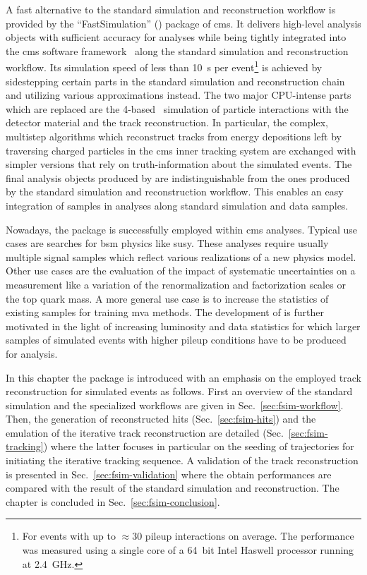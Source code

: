 A fast alternative to the standard simulation and reconstruction workflow is provided by the ``FastSimulation'' (\FSIM[format=hyperbf]) package of \gls{cms}. It delivers high-level analysis objects with sufficient accuracy for analyses while being tightly integrated into the \gls{cms} software framework~\cite{Bayatian:922757} along the standard simulation and reconstruction workflow. Its simulation speed of less than 10~s per event\footnote{For events with up to $\approx30$ pileup interactions on average. The performance was measured using a single core of a 64~bit Intel Haswell processor running at 2.4~GHz.} is achieved by sidestepping certain parts in the standard simulation and reconstruction chain and utilizing various approximations instead. The two major CPU-intense parts which are replaced are the \GEANT{}4-based~\cite{Agostinelli2003250} simulation of particle interactions with the detector material and the track reconstruction. In particular, the complex, multistep algorithms which reconstruct tracks from energy depositions left by traversing charged particles in the \gls{cms} inner tracking system are exchanged with simpler versions that rely on truth-information about the simulated events. The final analysis objects produced by \FSIM are indistinguishable from the ones produced by the standard simulation and reconstruction workflow. This enables an easy integration of \FSIM samples in analyses along standard simulation and data samples.

Nowadays, the \FSIM package is successfully employed within \gls{cms} analyses. Typical use cases are searches for \acrfull{bsm} physics like \acrfull{susy}. These analyses require usually multiple signal samples which reflect various realizations of a new physics model. Other use cases are the evaluation of the impact of systematic uncertainties on a measurement like a variation of the renormalization and factorization scales or the top quark mass. A more general use case is to increase the statistics of existing samples for training \acrfull{mva} methods. The development of \FSIM is further motivated in the light of increasing luminosity and data statistics for which larger samples of simulated events with higher pileup conditions have to be produced for analysis.

In this chapter the \FSIM package is introduced with an emphasis on the employed track reconstruction for simulated events as follows. First an overview of the standard simulation and the specialized \FSIM workflows are given in Sec.~\ref{sec:fsim-workflow}. Then, the generation of reconstructed hits (Sec.~\ref{sec:fsim-hits}) and the emulation of the iterative track reconstruction are detailed (Sec.~\ref{sec:fsim-tracking}) where the latter focuses in particular on the seeding of trajectories for initiating the iterative tracking sequence. A validation of the track reconstruction is presented in Sec.~\ref{sec:fsim-validation} where the obtain performances are compared with the result of the standard simulation and reconstruction. The chapter is concluded in Sec.~\ref{sec:fsim-conclusion}.


